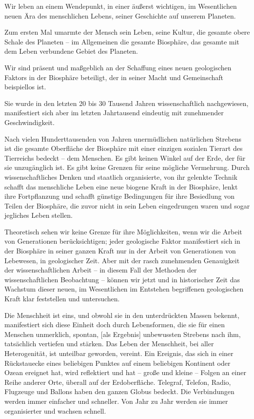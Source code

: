 \documentclass[11pt,a4paper]{book}
\begin{document}
Wir leben an einem Wendepunkt, in einer äußerst wichtigen, im Wesentlichen neuen Ära des menschlichen Lebens, seiner Geschichte auf unserem Planeten. 

Zum ersten Mal umarmte der Mensch sein Leben, seine Kultur, die gesamte obere Schale des Planeten -- im Allgemeinen die gesamte Biosphäre, das gesamte mit dem Leben verbundene Gebiet des Planeten. 

Wir sind präsent und maßgeblich an der Schaffung eines neuen geologischen Faktors in der Biosphäre beteiligt, der in seiner Macht und Gemeinschaft beispiellos ist. 

Sie wurde in den letzten 20 bis 30 Tausend Jahren wissenschaftlich nachgewiesen, manifestiert sich aber im letzten Jahrtausend eindeutig mit zunehmender Geschwindigkeit. 

Nach vielen Hunderttausenden von Jahren unermüdlichen natürlichen Strebens ist die gesamte Oberfläche der Biosphäre mit einer einzigen sozialen Tierart des Tierreichs bedeckt -- dem Menschen. Es gibt keinen Winkel auf der Erde, der für sie unzugänglich ist. Es gibt keine Grenzen für seine mögliche Vermehrung. Durch wissenschaftliches Denken und staatlich organisierte, von ihr gelenkte Technik schafft das menschliche Leben eine neue biogene Kraft in der Biosphäre, lenkt ihre Fortpflanzung und schafft günstige Bedingungen für ihre Besiedlung von Teilen der Biosphäre, die zuvor nicht in sein Leben eingedrungen waren und sogar jegliches Leben stellen. 





Theoretisch sehen wir keine Grenze für ihre Möglichkeiten, wenn wir die Arbeit von Generationen berücksichtigen; jeder geologische Faktor manifestiert sich in der Biosphäre in seiner ganzen Kraft nur in der Arbeit von Generationen von Lebewesen, in geologischer Zeit. Aber mit der rasch zunehmenden Genauigkeit der wissenschaftlichen Arbeit -- in diesem Fall der Methoden der wissenschaftlichen Beobachtung -- können wir jetzt und in historischer Zeit das Wachstum dieser neuen, im Wesentlichen im Entstehen begriffenen geologischen Kraft klar feststellen und untersuchen. 

Die Menschheit ist eins, und obwohl sie in den unterdrückten Massen bekennt, manifestiert sich diese Einheit doch durch Lebensformen, die sie für einen Menschen unmerklich, spontan, [als Ergebnis] unbewussten Strebens nach ihm, tatsächlich vertiefen und stärken. Das Leben der Menschheit, bei aller Heterogenität, ist unteilbar geworden, vereint. Ein Ereignis, das sich in einer Rückstauecke eines beliebigen Punktes auf einem beliebigen Kontinent oder Ozean ereignet hat, wird reflektiert und hat -- große und kleine -- Folgen an einer Reihe anderer Orte, überall auf der Erdoberfläche. Telegraf, Telefon, Radio, Flugzeuge und Ballons haben den ganzen Globus bedeckt. Die Verbindungen werden immer einfacher und schneller. Von Jahr zu Jahr werden sie immer organisierter und wachsen schnell. 
\end{document}
